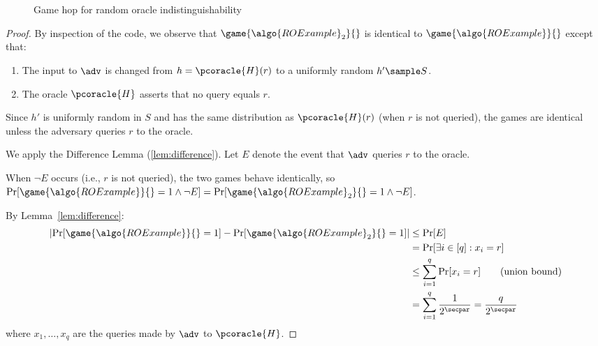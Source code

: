 \begin{figure}[tbhp]
  \begin{center}
    \begin{tcolorbox}[width=8cm]
      \begin{pchstack}
        \pchspace
      \end{pchstack}
    \end{tcolorbox}
  \end{center}
  \caption{Game hop for random oracle indistinguishability\label{fig:ro-game-hop}}
\end{figure}

\begin{proof}
  By inspection of the code, we observe that $\game{\algo{ROExample}_2}{}$ is identical to $\game{\algo{ROExample}}{}$ except that:
  \begin{enumerate}
  \item The input to $\adv$ is changed from $h = \pcoracle{H}(r)$ to a uniformly random $h' \sample S$.
  \item The oracle $\pcoracle{H}$ asserts that no query equals $r$.
  \end{enumerate}
  
  Since $h'$ is uniformly random in $S$ and has the same distribution as $\pcoracle{H}(r)$ (when $r$ is not queried), the games are identical unless the adversary queries $r$ to the oracle.
  
  We apply the Difference Lemma (\autoref{lem:difference}).
  Let $E$ denote the event that $\adv$ queries $r$ to the oracle.
  
  When $\neg E$ occurs (i.e., $r$ is not queried), the two games behave identically, so $\Pr[\game{\algo{ROExample}}{} = 1 \wedge \neg E] = \Pr[\game{\algo{ROExample}_2}{} = 1 \wedge \neg E]$. 
  
  By Lemma~\ref{lem:difference}:
  \begin{align*}
    \left|\Pr[\game{\algo{ROExample}}{} = 1] - \Pr[\game{\algo{ROExample}_2}{} = 1]\right| &\leq \Pr[E] \\
    &= \Pr[\exists i \in [q] : x_i = r] \\
    &\leq \sum_{i=1}^q \Pr[x_i = r] \tag{union bound} \\
    &= \sum_{i=1}^q \frac{1}{2^\secpar} = \frac{q}{2^\secpar}
  \end{align*}
  where $x_1, \ldots, x_q$ are the queries made by $\adv$ to $\pcoracle{H}$.
\end{proof}

